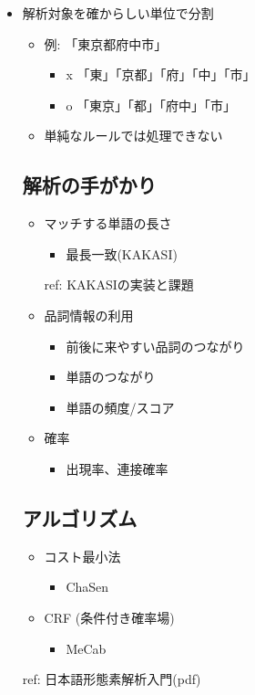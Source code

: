 \documentclass[mingoth,a4paper]{jsarticle}
\begin{document}
\begin{itemize}
\item 解析対象を確からしい単位で分割
  \begin{itemize}
  \item 例: 「東京都府中市」
    \begin{itemize}
    \item x 「東」「京都」「府」「中」「市」
    \item o 「東京」「都」「府中」「市」
    \end{itemize}
  \item 単純なルールでは処理できない
\end{itemize}

\subsection{解析の手がかり}

\begin{itemize}
\item マッチする単語の長さ
  \begin{itemize}
  \item 最長一致(KAKASI)
  \end{itemize}
  ref: KAKASIの実装と課題
\item 品詞情報の利用
  \begin{itemize}
    \item 前後に来やすい品詞のつながり
    \item  単語のつながり
    \item  単語の頻度/スコア
  \end{itemize}
\item 確率
  \begin{itemize}
  \item 出現率、連接確率
  \end{itemize}
\end{itemize}

\subsection{アルゴリズム}

\begin{itemize}
\item コスト最小法
  \begin{itemize}
  \item ChaSen
  \end{itemize}
\item CRF (条件付き確率場)
  \begin{itemize}
  \item MeCab
  \end{itemize}
\end{itemize}
ref: 日本語形態素解析入門(pdf)
\end{itemize}
\end{document}
